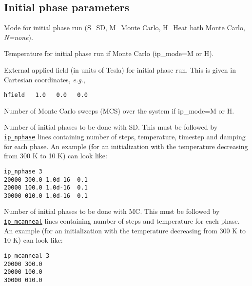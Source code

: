 \documentclass[11pt,fleqn,a4]{book} %
\makeatletter
\newcommand{\litem}[1]{\item[\bfseries#1\index{#1@\texttt{#1}}\label{#1}]}
\newcommand{\rkeyword}[1]{\hyperref[#1]{\texttt{#1}}}
\makeatother
\begin{document}
\subsection{Initial phase parameters}
\begin{description}[leftmargin=!,labelwidth=\widthof{\bfseries fifteenchars}]
\litem{ip_mode} Mode for initial phase run (S=SD, M=Monte Carlo, H=Heat bath Monte Carlo, \emph{N=none}).
\litem{ip_temp} Temperature for initial phase run if Monte Carlo (ip_mode=M or H).
\litem{ip_hfield} External applied field (in units of Tesla) for initial phase run. This is given in Cartesian coordinates, \textit{e.g.},

\begin{Verbatim}
hfield   1.0   0.0   0.0
\end{Verbatim}

\litem{ip_mcnstep} Number of Monte Carlo sweeps (MCS) over the system if ip_mode=M or H.
\litem{ip_nphase} Number of initial phases to be done with SD. This must be followed by \rkeyword{ip_nphase} lines containing number of steps, temperature, timestep and damping for each phase. An example (for an initialization with the temperature decreasing from 300 K to 10 K) can look like:
\begin{Verbatim}
ip_nphase 3
20000 300.0 1.0d-16  0.1
20000 100.0 1.0d-16  0.1
30000 010.0 1.0d-16  0.1
\end{Verbatim}

\litem{ip_mcanneal} Number of initial phases to be done with MC. This must be followed by \rkeyword{ip_mcanneal} lines containing number of steps and temperature for each phase. An example (for an initialization with the temperature decreasing from 300 K to 10 K) can look like:
\begin{verbatim}
ip_mcanneal 3
20000 300.0
20000 100.0 
30000 010.0 
\end{verbatim}
\end{description}


\end{document}
